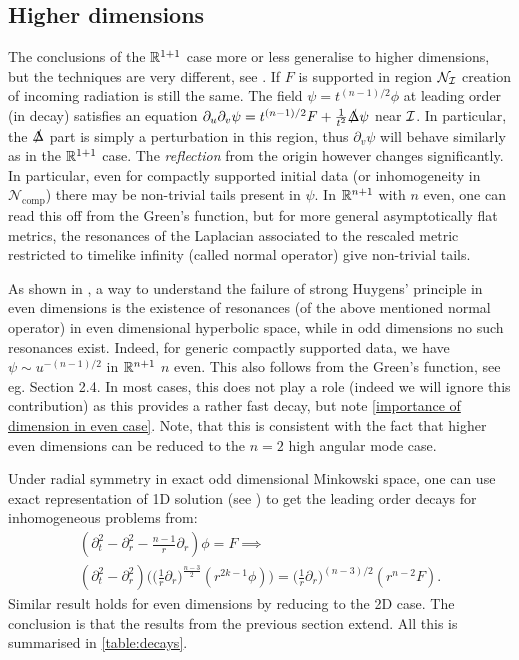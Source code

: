 \documentclass[11pt, oneside]{amsart}
\begin{document}
	\subsection{Higher dimensions}
	The conclusions of the $\mathbb{R}^{1+1}$ case more or less generalise to higher dimensions, but the techniques are very different, see \cite{baskin_asymptotics_2018}. 	If $F$ is supported in region $\mathcal{N}_{\mathcal{I}}$ creation of incoming radiation is still the same.  The field $\psi=t^{(n-1)/2}\phi$ at leading order (in decay) satisfies an equation $\partial_u\partial_v\psi=t^{(n-1)/2}F+\frac{1}{t^2}\slashed{\Delta}\psi$ near $\mathcal{I}$. In particular, the $\slashed{\Delta}$ part is simply a perturbation in this region, thus $\partial_v\psi$ will behave similarly as in the $\mathbb{R}^{1+1}$ case. The \textit{reflection} from the origin however changes significantly. In particular, even for compactly supported initial data (or inhomogeneity in $\mathcal{N}_{\text{comp}}$) there may be non-trivial tails present in $\psi$. In $\mathbb{R}^{n+1}$ with $n$ even, one can read this off from the Green's function, but for more general asymptotically flat metrics, the  resonances of the Laplacian associated to the rescaled metric restricted to timelike infinity (called normal operator) give non-trivial tails.
	
	\begin{remark}\label{even odd dimensions}
		As shown in \cite{baskin_asymptotics_2018}, a way to understand the failure of strong Huygens' principle in even dimensions is the existence of resonances (of the above mentioned normal operator) in even dimensional hyperbolic space, while in odd dimensions no such resonances exist. Indeed, for generic compactly supported data, we have $\psi\sim u^{-(n-1)/2}$ in $\mathbb{R}^{n+1}$ $n$ even. This also follows from the Green's function, see eg. \cite{evans_partial_2010} Section 2.4. In most cases, this does not play a role (indeed we will ignore this contribution) as this provides a rather fast decay, but note \cref{importance of dimension in even case}. Note, that this is consistent with the fact that higher even dimensions can be reduced to the $n=2$ high angular mode case.
	\end{remark}
	
	Under radial symmetry in exact odd dimensional Minkowski space, one can use exact representation of 1D solution (see \cite{evans_partial_2010}) to get the leading order decays for inhomogeneous problems from:
	\begin{equation}\label{exact formula in n dim}
		\begin{gathered}
			(\partial_t^2-\partial_r^2-\frac{n-1}{r}\partial_r)\phi=F\implies\\ (\partial_t^2-\partial_r^2)\bigg(\big(\frac{1}{r}\partial_r\big)^{\frac{n-3}{2}}(r^{2k-1}\phi)\bigg)=\big(\frac{1}{r}\partial_r\big)^{(n-3)/2}(r^{n-2}F).
		\end{gathered}
	\end{equation}
	Similar result holds for even dimensions by reducing to the 2D case. The conclusion is that the results from the previous section extend. All this is summarised in \cref{table:decays}. 
	
\end{document}
